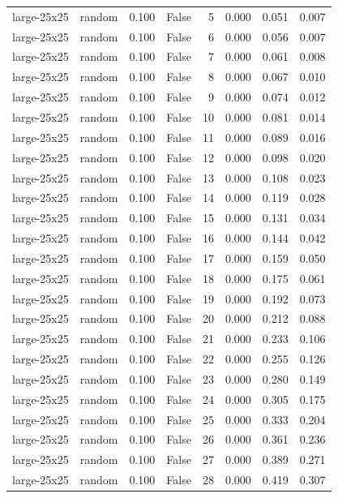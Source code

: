 \begin{tabular}{llrrrrrr}
large-25x25 & random & 0.100 & False & 5 & 0.000 & 0.051 & 0.007 \\
large-25x25 & random & 0.100 & False & 6 & 0.000 & 0.056 & 0.007 \\
large-25x25 & random & 0.100 & False & 7 & 0.000 & 0.061 & 0.008 \\
large-25x25 & random & 0.100 & False & 8 & 0.000 & 0.067 & 0.010 \\
large-25x25 & random & 0.100 & False & 9 & 0.000 & 0.074 & 0.012 \\
large-25x25 & random & 0.100 & False & 10 & 0.000 & 0.081 & 0.014 \\
large-25x25 & random & 0.100 & False & 11 & 0.000 & 0.089 & 0.016 \\
large-25x25 & random & 0.100 & False & 12 & 0.000 & 0.098 & 0.020 \\
large-25x25 & random & 0.100 & False & 13 & 0.000 & 0.108 & 0.023 \\
large-25x25 & random & 0.100 & False & 14 & 0.000 & 0.119 & 0.028 \\
large-25x25 & random & 0.100 & False & 15 & 0.000 & 0.131 & 0.034 \\
large-25x25 & random & 0.100 & False & 16 & 0.000 & 0.144 & 0.042 \\
large-25x25 & random & 0.100 & False & 17 & 0.000 & 0.159 & 0.050 \\
large-25x25 & random & 0.100 & False & 18 & 0.000 & 0.175 & 0.061 \\
large-25x25 & random & 0.100 & False & 19 & 0.000 & 0.192 & 0.073 \\
large-25x25 & random & 0.100 & False & 20 & 0.000 & 0.212 & 0.088 \\
large-25x25 & random & 0.100 & False & 21 & 0.000 & 0.233 & 0.106 \\
large-25x25 & random & 0.100 & False & 22 & 0.000 & 0.255 & 0.126 \\
large-25x25 & random & 0.100 & False & 23 & 0.000 & 0.280 & 0.149 \\
large-25x25 & random & 0.100 & False & 24 & 0.000 & 0.305 & 0.175 \\
large-25x25 & random & 0.100 & False & 25 & 0.000 & 0.333 & 0.204 \\
large-25x25 & random & 0.100 & False & 26 & 0.000 & 0.361 & 0.236 \\
large-25x25 & random & 0.100 & False & 27 & 0.000 & 0.389 & 0.271 \\
large-25x25 & random & 0.100 & False & 28 & 0.000 & 0.419 & 0.307 \\

\end{tabular}
